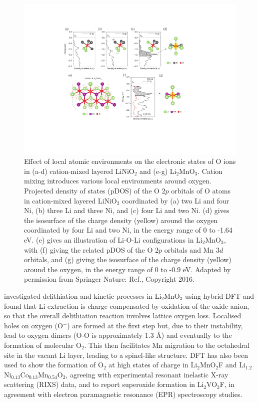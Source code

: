\documentclass[../main.tex]{subfiles}
\begin{document}
\begin{figure}
    \centering
    \includegraphics[scale=0.7]{figures/o_redox.pdf}
    \caption{ Effect of local atomic environments on the electronic states of O ions in (a-d) cation-mixed layered LiNiO$_2$ and (e-g) Li$_2$MnO$_3$. Cation mixing introduces various local environments around oxygen. Projected density of states (pDOS) of the O $2p$ orbitals of O atoms in cation-mixed layered LiNiO$_2$ coordinated by (a) two Li and four Ni, (b) three Li and three Ni, and (c) four Li and two Ni. (d) gives the isosurface of the charge density (yellow) around the oxygen coordinated by four Li and two Ni, in the energy range of 0 to -1.64 eV. (e) gives an illustration of Li-O-Li configurations in Li$_2$MnO$_3$, with (f) giving the related pDOS of the O $2p$ orbitals and Mn $3d$ orbitals, and (g) giving the isosurface of the charge density (yellow) around the oxygen, in the energy range of 0 to -0.9 eV. Adapted by permission from Springer Nature: Ref., Copyright 2016.}
    \label{fig:o_redox}
\end{figure}

\citeauthor{Chen2016} investigated delithiation and kinetic processes in Li$_2$MnO$_3$ using hybrid DFT and found that Li extraction is charge-compensated by oxidation of the oxide anion, so that the overall delithiation reaction involves lattice oxygen loss.\cite{Chen2016} Localised holes on oxygen (O$^-$) are formed at the first step but, due to their instability, lead to oxygen dimers (O-O is approximately 1.3 \AA) and eventually to the formation of molecular O$_2$. This then facilitates Mn migration to the octahedral site in the vacant Li layer, leading to a spinel-like structure. DFT has also been used to show the formation of O$_2$ at high states of charge in Li$_2$MnO$_2$F\cite{Sharpe2020} and Li$_{1.2}$Ni$_{0.13}$Co$_{0.13}$Mn$_{0.54}$O$_2$, \cite{House2020a} agreeing with experimental resonant inelastic X-ray scattering (RIXS) data, and to report superoxide formation in Li$_2$VO$_2$F, in agreement with electron paramagnetic resonance (EPR) spectroscopy studies.\cite{Chang2020}
\end{document}
